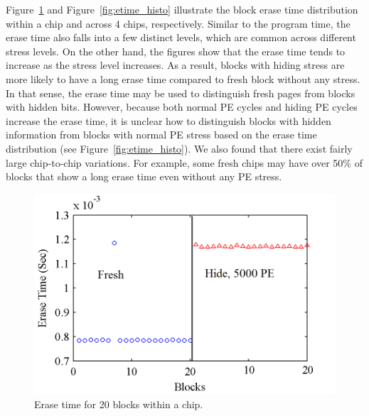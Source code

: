 

Figure~\ref{fig:etime_chip1} and Figure~\ref{fig:etime_histo} illustrate the block
erase time distribution within a chip and across 4 chips, respectively.
Similar to the program time, the erase time also falls into a few distinct levels,
which are common across different stress levels. On the other hand,
the figures show that the erase time tends to increase as the stress level
increases. As a result, blocks with hiding stress are more likely to have
a long erase time compared to fresh block without any stress. In that sense,
the erase time may be used to distinguish fresh pages from blocks with hidden bits. 
However, because both normal PE cycles and hiding PE cycles increase
the erase time, it is unclear how to distinguish blocks with hidden information
from blocks with normal PE stress based on the erase time distribution
(see Figure~\ref{fig:etime_histo}). 
We also found that there exist fairly large chip-to-chip variations.
For example, some fresh chips may have over 50\% of blocks that show a long
erase time even without any PE stress. 

\begin{figure} 
\begin{center} 
\includegraphics[width=\mywidth]{figs/erasetime_block.png} 
\caption{Erase time for 20 blocks within a chip.}
\label{fig:etime_chip1} 
\vspace{-0.1in}

\end{center} 
\end{figure}

